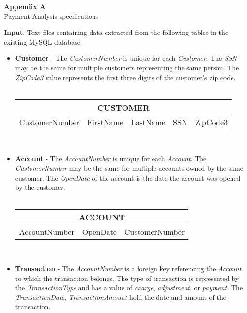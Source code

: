 \documentclass[letterpaper,12pt,titlepage]{article}
\begin{document}
\begin{center}
{\Large \textbf{Appendix A}}\\ 
{\large Payment Analysis specifications} 
\end{center}
\textbf{Input}. Text files containing data extracted from the following tables
in the existing MySQL database. 
\begin{itemize}
    \item \textbf{Customer} - The \textit{CustomerNumber} is unique for
	  each \textit{Customer}. The \textit{SSN} may be the same for multiple
	  customers representing the same person. The \textit{ZipCode3} value
	  represents the first three digits of the customer's zip code. \\\\
      \begin{tabular}[c]{|l|l|l|l|l|}
      \hline
      \multicolumn{5}{|c|}{CUSTOMER} \\
      \hline
      CustomerNumber & FirstName & LastName & SSN & ZipCode3 \\
      \hline
      \end{tabular}\\
    \item \textbf{Account} - The \textit{AccountNumber} is unique for each
	  \textit{Account}. The \textit{CustomerNumber} may be the same for
	  multiple accounts owned by the same customer. The  
	  \textit{OpenDate} of the account is the date the account was
	  opened by the customer.\\\\
      \begin{tabular}[c]{|l|l|l|}
      \hline
      \multicolumn{3}{|c|}{ACCOUNT} \\
      \hline
      AccountNumber & OpenDate & CustomerNumber \\
      \hline
      \end{tabular}\\
    \item \textbf{Transaction} - The \textit{AccountNumber} is a foreign key
	  referencing the \textit{Account} to which the transaction belongs. The
	  type of transaction is represented by the \textit{TransactionType} and
	  has a value of \textit{charge}, \textit{adjustment}, or
	  \textit{payment}. The \textit{TransactionDate},
	  \textit{TransactionAmount} hold the date and amount of the
	  transaction.\\\\
      \begin{tabular}[c]{|l|l|l|l|}

\end{tabular}
\end{itemize}
\end{document}
